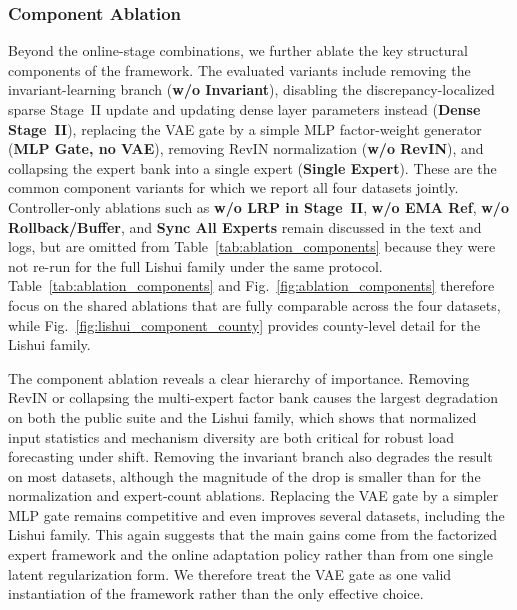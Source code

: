 ﻿\documentclass[journal]{IEEEtran}
\begin{document}
\subsubsection{Component Ablation}
Beyond the online-stage combinations, we further ablate the key structural components of the framework. The evaluated variants include removing the invariant-learning branch (\textbf{w/o Invariant}), disabling the discrepancy-localized sparse Stage~II update and updating dense layer parameters instead (\textbf{Dense Stage~II}), replacing the VAE gate by a simple MLP factor-weight generator (\textbf{MLP Gate, no VAE}), removing RevIN normalization (\textbf{w/o RevIN}), and collapsing the expert bank into a single expert (\textbf{Single Expert}). These are the common component variants for which we report all four datasets jointly. Controller-only ablations such as \textbf{w/o LRP in Stage~II}, \textbf{w/o EMA Ref}, \textbf{w/o Rollback/Buffer}, and \textbf{Sync All Experts} remain discussed in the text and logs, but are omitted from Table~\ref{tab:ablation_components} because they were not re-run for the full Lishui family under the same protocol. Table~\ref{tab:ablation_components} and Fig.~\ref{fig:ablation_components} therefore focus on the shared ablations that are fully comparable across the four datasets, while Fig.~\ref{fig:lishui_component_county} provides county-level detail for the Lishui family.

The component ablation reveals a clear hierarchy of importance. Removing RevIN or collapsing the multi-expert factor bank causes the largest degradation on both the public suite and the Lishui family, which shows that normalized input statistics and mechanism diversity are both critical for robust load forecasting under shift. Removing the invariant branch also degrades the result on most datasets, although the magnitude of the drop is smaller than for the normalization and expert-count ablations. Replacing the VAE gate by a simpler MLP gate remains competitive and even improves several datasets, including the Lishui family. This again suggests that the main gains come from the factorized expert framework and the online adaptation policy rather than from one single latent regularization form. We therefore treat the VAE gate as one valid instantiation of the framework rather than the only effective choice.
\end{document}
